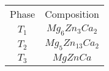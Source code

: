 \begin{tabular}{ c c }
  Phase & Composition \\
  $T_{1}$ & $Mg_{6} Zn_{3} Ca_{2}$ \\
  $T_{2}$ & $Mg_{5} Zn_{13} Ca_{2}$ \\
  $T_{3}$ & $Mg Zn Ca$ \\
\end{tabular}
    
    
    
    